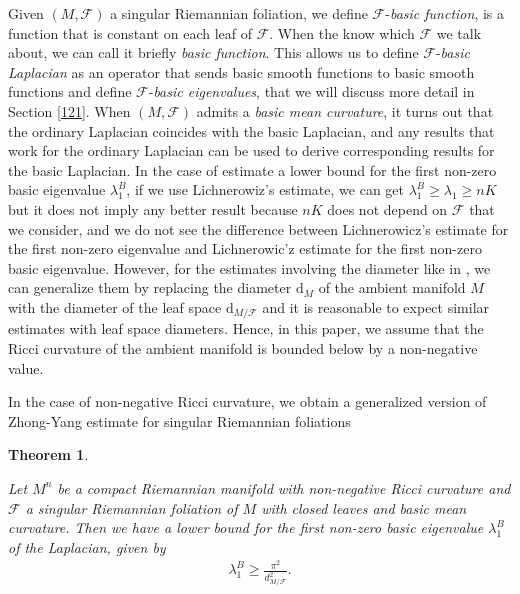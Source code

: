 \documentclass[11pt]{amsart}
\newtheorem{theorem}{Theorem}[section]
\def\d{\mathrm{d}}
\begin{document}
Given $(M,\mathcal{F})$ a singular Riemannian foliation, we define $\mathcal{F}$-\textit{basic function}, is a function that is constant on each leaf of $\mathcal{F}$. When the know which $\mathcal{F}$ we talk about, we can call it briefly \textit{basic function}. This allows us to define $\mathcal{F}$-\textit{basic Laplacian} as an operator that sends basic smooth functions to basic smooth functions and define $\mathcal{F}$-\textit{basic eigenvalues}, that we will discuss more detail in Section \ref{121}. When $(M,\mathcal{F})$ admits a \textit{basic mean curvature}, it turns out that the ordinary Laplacian coincides with the basic Laplacian, and any results that work for the ordinary Laplacian can be used to derive corresponding results for the basic Laplacian. In the case of estimate a lower bound for the first non-zero basic eigenvalue $\lambda_1^B$, if we use Lichnerowiz's estimate, we can get $\lambda_1^B\geq \lambda_1\geq nK$ but it does not imply any better result because $nK$ does not depend on $\mathcal{F}$ that we consider, and we do not see the difference between Lichnerowicz's estimate for the first non-zero eigenvalue and Lichnerowic'z estimate for the first non-zero basic eigenvalue. However, for the estimates involving the diameter like in \cite{zhongyang,progen,mufawang,benjulie,zhangwang,shizhang}, we can generalize them by replacing the diameter $\d_M$ of the ambient manifold $M$ with the diameter of the leaf space $\d_{M/\mathcal{F}}$ and it is reasonable to expect similar estimates with leaf space diameters. Hence, in this paper, we assume that the Ricci curvature of the ambient manifold is bounded below by a non-negative value. 

In the case of non-negative Ricci curvature, we obtain a generalized version of Zhong-Yang estimate for singular Riemannian foliations
        \begin{theorem}\label{main1}

    Let $M^n$ be a compact Riemannian manifold with non-negative Ricci curvature and $\mathcal{F}$ a singular Riemannian foliation of $M$ with closed leaves and basic mean curvature. Then we have a lower bound for the first non-zero basic eigenvalue $\lambda_1^B$ of the Laplacian, given by \begin{align}
        \lambda_1^B\geq \frac{\pi^2}{d_{M/\mathcal{F}}^2}.
    \end{align}
\end{theorem}
\end{document}
